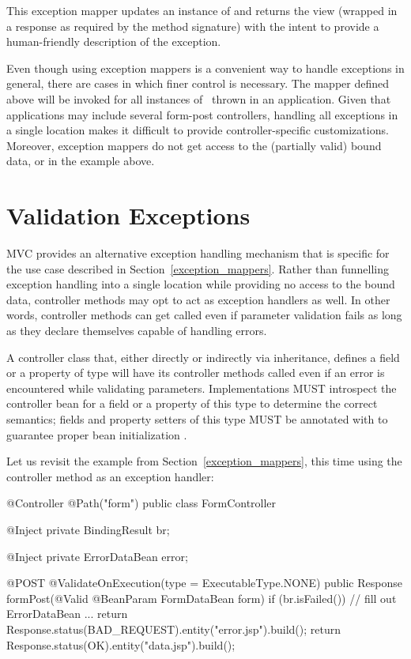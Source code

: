 This exception mapper updates an instance of  and returns 
the  view 
(wrapped in a response as required by the method signature) with the intent to provide a 
human-friendly description of the exception.

Even though using exception mappers is a convenient way to handle exceptions in general, 
there are cases in which finer control is necessary. The mapper defined above will be
invoked for all instances of \ConstVioExc\ thrown in an application. Given that 
applications may include several form-post controllers, handling all exceptions in
a single location makes it difficult to provide controller-specific customizations.
Moreover, exception mappers do not get access to the (partially valid) bound
data, or  in the example above.

\section{Validation Exceptions}
\label{validation_exceptions}

MVC provides an alternative exception handling mechanism that is specific for the 
use case described in Section~\ref{exception_mappers}. Rather than funnelling 
exception handling into a single location while providing no access to the bound
data, controller methods may opt to act as exception handlers as well. In other words, 
controller methods can get called even if parameter validation fails as long as
they declare themselves capable of handling errors.

A controller class that, either directly or indirectly via inheritance, defines 
a field or a property of type 
 will have its controller methods
called even if an error is encountered while validating parameters. 
Implementations MUST introspect the controller bean for a field or a property of
this type to determine the correct semantics; fields and property setters
of this type MUST be annotated with  to guarantee proper bean
initialization .

Let us revisit the example from Section~\ref{exception_mappers},
this time using the controller method as an exception handler:

\begin{listing}{1}
@Controller
@Path("form")
public class FormController {

    @Inject
    private BindingResult br;
    
    @Inject
    private ErrorDataBean error;

    @POST
    @ValidateOnExecution(type = ExecutableType.NONE)
    public Response formPost(@Valid @BeanParam FormDataBean form) {
        if (br.isFailed()) {
            // fill out ErrorDataBean ...
            return Response.status(BAD_REQUEST).entity("error.jsp").build();
        }
        return Response.status(OK).entity("data.jsp").build();    
    }
}
\end{listing}

